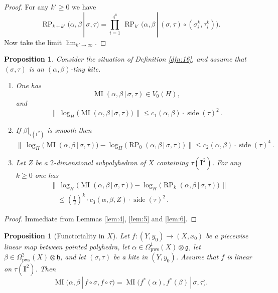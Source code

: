 \documentclass[10pt, a4paper]{amsart}
\newtheorem{prop}[equation]{Proposition}
\theoremstyle{definition}
\numberwithin{equation}{section}
\newcommand{\opn}{\operatorname}
\newcommand{\mfrak}[1]{\mathfrak{#1}}
\newcommand{\mbf}[1]{\mathbf{#1}}
\newcommand{\mrm}[1]{\mathrm{#1}}
\newcommand{\smfrac}[2]{{\textstyle \frac{#1}{#2}}}
\newcommand{\tup}[1]{\textup{#1}}
\newcommand{\Norm}[1]{\bigl\lVert\, #1 \, \bigr\rVert}
\renewcommand{\vert}{\, | \,}
\newcommand{\g}{\mfrak{g}}
\newcommand{\h}{\mfrak{h}}
\begin{document}
\begin{proof}
For any $k' \geq 0$ we have
\[ \opn{RP}_{k + k'}(\alpha, \beta \vert \sigma, \tau) =
\prod_{i = 1}^{4^k} \,
\opn{RP}_{k'} \bigl( \alpha, \beta \vert (\sigma, \tau) \circ 
(\sigma^k_i, \tau^k_i) \bigr) . \]
Now take the limit $\lim_{k' \to \infty}$.
\end{proof}

\begin{prop} \label{prop:8}
Consider the situation of Definition \tup{\ref{dfn:16}}, and assume that 
$(\sigma, \tau)$ is an $(\alpha, \beta)$-tiny kite.
\begin{enumerate}
\item One has
\[ \opn{MI}(\alpha, \beta \vert \sigma, \tau) \in V_0(H) , \]
and
\[ \Norm{ \opn{log}_H \bigl( \opn{MI}(\alpha, \beta \vert \sigma, \tau)
\bigr) } \leq 
c_1(\alpha, \beta) \cdot \opn{side}(\tau)^2 \, . \]

\item If $\beta|_{\tau(\mbf{I}^{2})}$ is smooth then 
\[ \Norm{ \opn{log}_H \bigl( \opn{MI}(\alpha, \beta \vert 
\sigma, \tau) \bigr) -
\opn{log}_H \bigl( \opn{RP}_{0}(\alpha, \beta \vert \sigma, \tau) \bigr) } 
\leq c_2(\alpha, \beta) \cdot \opn{side}(\tau)^4  \, .
\]

\item Let $Z$ be a $2$-dimensional subpolyhedron of $X$ containing 
$\tau(\mbf{I}^2)$. For any $k \geq 0$ one has
\[ \begin{aligned}
& \Norm{ \opn{log}_H \bigl( \opn{MI}(\alpha, \beta \vert 
\sigma, \tau) \bigr) -
\opn{log}_H \bigl( \opn{RP}_{k}(\alpha, \beta \vert \sigma, \tau) \bigr) } \\
& \quad \leq (\smfrac{1}{2})^k \cdot c_3(\alpha, \beta, Z) \cdot 
\opn{side}(\tau)^2  \, .
\end{aligned} \]
\end{enumerate}
\end{prop}

\begin{proof}
Immediate from Lemmas \ref{lem:4}, \ref{lem:5} and \ref {lem:6}.
\end{proof}

\begin{prop}[Functoriality in $X$] \label{prop:10}
Let $f : (Y, y_0) \to (X, x_0)$ be a piecewise linear map between pointed
polyhedra, let
$\alpha \in \Omega^1_{\mrm{pws}}(X) \otimes \g$, let
$\beta \in \Omega^2_{\mrm{pws}}(X) \otimes \h$, 
and let $(\sigma, \tau)$ be a kite in $(Y, y_0)$.
Assume that $f$ is linear on $\tau(\mbf{I}^2)$. Then
\[ \opn{MI}(\alpha, \beta \vert f \circ \sigma, f \circ \tau) = 
\opn{MI} \bigl( f^*(\alpha), f^*(\beta) \vert  \sigma, \tau \bigl) . \]
\end{prop}
\end{document}
